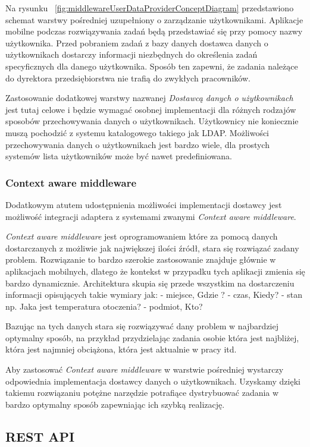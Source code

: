 Na rysunku ~\ref{fig:middlewareUserDataProviderConceptDiagram} przedstawiono schemat warstwy pośredniej uzupełniony o zarządzanie użytkownikami. Aplikacje mobilne podczas rozwiązywania zadań będą przedstawiać się przy pomocy nazwy użytkownika. Przed pobraniem zadań z bazy danych dostawca danych o użytkownikach dostarczy informacji niezbędnych do określenia zadań specyficznych dla danego użytkownika. Sposób ten zapewni, że zadania należące do dyrektora przedsiębiorstwa nie trafią do zwykłych pracowników. 

Zastosowanie dodatkowej warstwy nazwanej \textit{Dostawcą danych o użytkownikach} jest tutaj celowe i będzie wymagać osobnej implementacji dla różnych rodzajów sposobów przechowywania danych o użytkownikach. Użytkownicy nie koniecznie muszą pochodzić z systemu katalogowego takiego jak LDAP. Możliwości przechowywania danych o użytkownikach jest bardzo wiele, dla prostych systemów lista użytkowników może być nawet predefiniowana.

\subsubsection{Context aware middleware}
Dodatkowym atutem udostępnienia możliwości implementacji dostawcy jest możliwość integracji adaptera z systemami zwanymi \textit{Context aware middleware}. 

\textit{Context aware middleware} jest oprogramowaniem które za pomocą danych dostarczanych z możliwie jak największej ilości źródł, stara się rozwiązać zadany problem. Rozwiązanie to bardzo szerokie zastosowanie znajduje głównie w aplikacjach mobilnych, dlatego że kontekst w przypadku tych aplikacji zmienia się bardzo dynamicznie. Architektura skupia się przede wszystkim na dostarczeniu informacji opisujących takie wymiary jak: - miejsce, Gdzie ? - czas, Kiedy? - stan np. Jaka jest temperatura otoczenia? - podmiot, Kto?

Bazując na tych danych stara się rozwiązywać dany problem w najbardziej optymalny sposób, na przykład przydzielając zadania osobie która jest najbliżej, która jest najmniej obciążona, która jest aktualnie w pracy itd.

Aby zastosować \textit{Context aware middleware} w warstwie pośredniej wystarczy odpowiednia implementacja dostawcy danych o użytkownikach. Uzyskamy dzięki takiemu rozwiązaniu potężne narzędzie potrafiące dystrybuować zadania w bardzo optymalny sposób zapewniając ich szybką realizację.  

\subsection{REST API}

